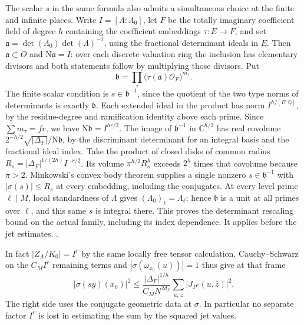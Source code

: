 The scalar \(s\) in the same formula also admits a simultaneous
choice at the finite and infinite places. Write
\(I=[\Lambda:\Lambda_0]\), let \(F\) be the totally imaginary
coefficient field of degree \(h\) containing the coefficient
embeddings \(\tau:E\to F\), and set
\(\mathfrak a=\det(\Lambda_0)\det(\Lambda)^{-1}\), using the
fractional determinant ideals in \(E\). Then
\(\mathfrak a\subset O\) and \(\mathrm N\mathfrak a=I\):
over each discrete valuation ring the inclusion has elementary
divisors and both statements follow by multiplying those divisors.
Put
\[
 \mathfrak b=\prod_\tau
       \big(\tau(\mathfrak a)\mathcal O_F\big)^{m_\tau}.
\]
The finite scalar condition is \(s\in\mathfrak b^{-1}\), since
the quotient of the two type norms of determinants is exactly
\(\mathfrak b\). Each extended ideal in the product has norm
\(I^{h/[E:\mathbb Q]}\), by the residue-degree and ramification
identity above each prime. Since \(\sum m_\tau=fr\), we have
\(\mathrm N\mathfrak b=I^{hr/2}\).
The image of \(\mathfrak b^{-1}\) in \(\mathbb C^{h/2}\) has real
covolume \(2^{-h/2}\sqrt{|\Delta_F|}/\mathrm N\mathfrak b\),
by the discriminant determinant for an integral basis and the
fractional ideal index. Take the product of closed disks of common
radius \(R_s=|\Delta_F|^{1/(2h)} I^{-r/2}\). Its volume
\(\pi^{h/2}R_s^h\) exceeds \(2^h\) times that covolume because
\(\pi>2\). Minkowski's convex body theorem supplies a single nonzero
\(s\in\mathfrak b^{-1}\) with \(|\sigma(s)|\le R_s\) at every
embedding, including the conjugates. At every level prime
\(\ell\mid M\), local standardness of \(\Lambda\) gives
\((\Lambda_0)_\ell=\Lambda_\ell\); hence \(\mathfrak b\) is a unit
at all primes over \(\ell\), and this same \(s\) is integral there.
This proves the determinant rescaling bound on the actual family,
including its index dependence. It applies before the jet estimates.
.

In fact \(|Z_\Lambda/K_0|=I^r\) by the same locally free tensor
calculation. Cauchy--Schwarz on the \(C_M I^r\) remaining terms
and \(|\sigma(\omega_{x_0}(u))|=1\) thus give at that frame
\[
 |\sigma(sy)(x_0)|^2
 \le \frac{|\Delta_F|^{1/h}}{C_M N^{2d_P}}
       \sum_{u,\,\bar z}|J_{P^\sigma}(u,\bar z)|^2 .
\]
The right side uses the conjugate geometric data at \(\sigma\).
In particular no separate factor \(I^r\) is lost in estimating the
sum by the squared jet values.


